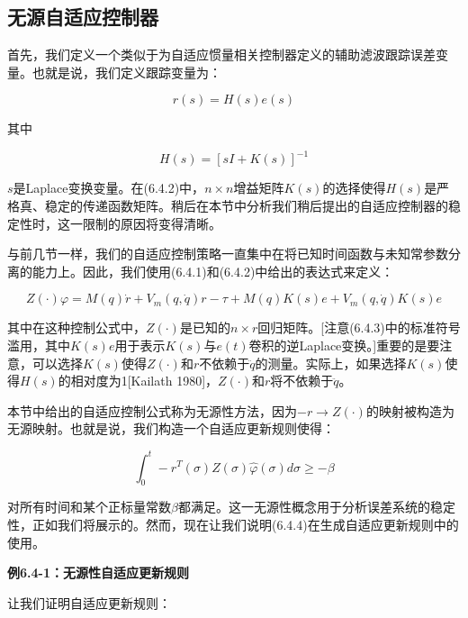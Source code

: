 \documentclass[12pt,a4paper]{ctexart}
\begin{document}
\subsection*{无源自适应控制器}

首先，我们定义一个类似于为自适应惯量相关控制器定义的辅助滤波跟踪误差变量。也就是说，我们定义跟踪变量为：

\begin{equation}\label{eq:tracking-var}
r(s) = H(s)e(s)
\end{equation}

其中

\begin{equation}\label{eq:H-def}
H(s) = [sI + K(s)]^{-1}
\end{equation}

$s$是Laplace变换变量。在(6.4.2)中，$n \times n$增益矩阵$K(s)$的选择使得$H(s)$是严格真、稳定的传递函数矩阵。稍后在本节中分析我们稍后提出的自适应控制器的稳定性时，这一限制的原因将变得清晰。

与前几节一样，我们的自适应控制策略一直集中在将已知时间函数与未知常参数分离的能力上。因此，我们使用(6.4.1)和(6.4.2)中给出的表达式来定义：

\begin{equation}\label{eq:Z-def}
Z(\cdot)\varphi = M(q)\dot{r} + V_m(q, \dot{q})r - \tau + M(q)K(s)e + V_m(q, \dot{q})K(s)e
\end{equation}

其中在这种控制公式中，$Z(\cdot)$是已知的$n \times r$回归矩阵。[注意(6.4.3)中的标准符号滥用，其中$K(s)e$用于表示$K(s)$与$e(t)$卷积的逆Laplace变换。]重要的是要注意，可以选择$K(s)$使得$Z(\cdot)$和$r$不依赖于$\ddot{q}$的测量。实际上，如果选择$K(s)$使得$H(s)$的相对度为1[Kailath 1980]，$Z(\cdot)$和$r$将不依赖于$\ddot{q}$。

本节中给出的自适应控制公式称为无源性方法，因为$-r \rightarrow Z(\cdot)$的映射被构造为无源映射。也就是说，我们构造一个自适应更新规则使得：

\begin{equation}\label{eq:passivity}
\int_0^t -r^T(\sigma)Z(\sigma)\hat{\varphi}(\sigma)d\sigma \geq -\beta
\end{equation}

对所有时间和某个正标量常数$\beta$都满足。这一无源性概念用于分析误差系统的稳定性，正如我们将展示的。然而，现在让我们说明(6.4.4)在生成自适应更新规则中的使用。

\textbf{例6.4-1：无源性自适应更新规则}

让我们证明自适应更新规则：
\end{document}
